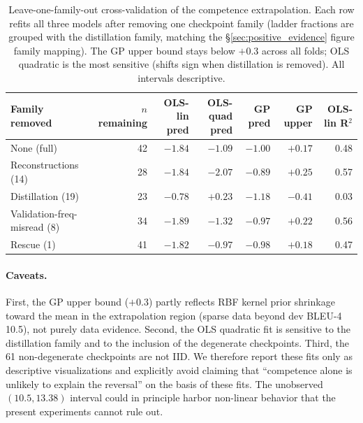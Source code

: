 \documentclass[pdflatex,sn-chicago]{sn-jnl}
\begin{document}
\begin{table}[h]
\centering
\scriptsize
\caption{Leave-one-family-out cross-validation of the competence extrapolation. Each row refits all three models after removing one checkpoint family (ladder fractions are grouped with the distillation family, matching the \S\ref{sec:positive_evidence} figure family mapping). The GP upper bound stays below $+0.3$ across all folds; OLS quadratic is the most sensitive (shifts sign when distillation is removed). All intervals descriptive.}
\label{tab:loo_extrapolation}
\begin{tabular}{lrrrrrr}
\toprule
Family removed & $n$ remaining & OLS-lin pred & OLS-quad pred & GP pred & GP upper & OLS-lin R$^2$ \\
\midrule
None (full) & 42 & $-1.84$ & $-1.09$ & $-1.00$ & $+0.17$ & 0.48 \\
Reconstructions (14) & 28 & $-1.84$ & $-2.07$ & $-0.89$ & $+0.25$ & 0.57 \\
Distillation (19) & 23 & $-0.78$ & $+0.23$ & $-1.18$ & $-0.41$ & 0.03 \\
Validation-freq-misread (8) & 34 & $-1.89$ & $-1.32$ & $-0.97$ & $+0.22$ & 0.56 \\
Rescue (1) & 41 & $-1.82$ & $-0.97$ & $-0.98$ & $+0.18$ & 0.47 \\
\bottomrule
\end{tabular}
\end{table}

\paragraph{Caveats.}
First, the GP upper bound ($+0.3$) partly reflects RBF kernel prior shrinkage toward the mean in the extrapolation region (sparse data beyond dev BLEU-4 10.5), not purely data evidence. Second, the OLS quadratic fit is sensitive to the distillation family and to the inclusion of the degenerate checkpoints. Third, the 61 non-degenerate checkpoints are not IID. We therefore report these fits only as descriptive visualizations and explicitly avoid claiming that ``competence alone is unlikely to explain the reversal'' on the basis of these fits. The unobserved $(10.5, 13.38)$ interval could in principle harbor non-linear behavior that the present experiments cannot rule out.
\end{document}
